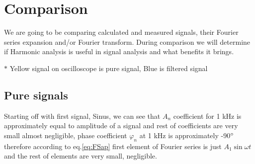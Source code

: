 \documentclass[notitlepage, a4paper, 11pt]{article}
\begin{document}
	\section{Comparison}
	We are going to be comparing calculated and measured signals, their Fourier series expansion and/or Fourier transform. During comparison we will determine if Harmonic analysis is useful in signal analysis and what benefits it brings.
	
	$\ast$ Yellow signal on oscilloscope is pure signal, Blue is filtered signal
	\subsection{Pure signals}
	Starting off with first signal, Sinus, we can see that $A_n$ coefficient for 1 kHz is approximately equal to amplitude of a signal and rest of coefficients are very small almost negligible, phase coefficient $\varphi_n$ at 1 kHz is approximately -90$\degree$ therefore according to eq.\eqref{eq:FSap} first element of Fourier series is just $A_1 \sin \omega t$ and the rest of elements are very small, negligible.
\end{document}
